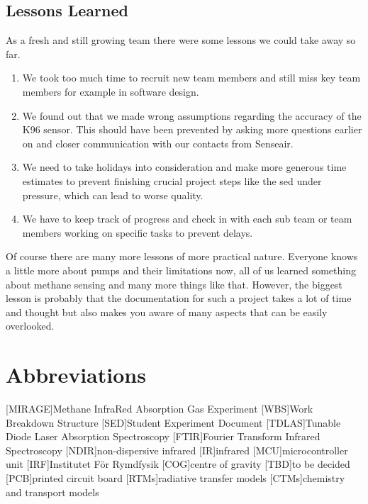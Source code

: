 \documentclass[12pt,a4paper]{report}
\begin{document}
\section{Lessons Learned}
As a fresh and still growing team there were some lessons we could take away so far. 
\begin{enumerate}
  \item We took too much time to recruit new team members and still miss key team members for example in software design.
  \item We found out that we made wrong assumptions regarding the accuracy of the K96 sensor. This should have been prevented by asking more questions earlier on and closer communication with our contacts from Senseair.
  \item We need to take holidays into consideration and make more generous time estimates to prevent finishing crucial project steps like the \ac{sed} under pressure, which can lead to worse quality.
  \item We have to keep track of progress and check in with each sub team or team members working on specific tasks to prevent delays.
\end{enumerate}
Of course there are many more lessons of more practical nature. Everyone knows a little more about pumps and their limitations now, all of us learned something about methane sensing and many more things like that. However, the biggest lesson is probably that the documentation for such a project takes a lot of time and thought but also makes you aware of many aspects that can be easily overlooked.

\chapter{Abbreviations}

\begin{acronym}[LONGESTACRONYM]
[MIRAGE]{Methane InfraRed Absorption Gas Experiment}
[WBS]{Work Breakdown Structure}
[SED]{Student Experiment Document}
[TDLAS]{Tunable Diode Laser Absorption Spectroscopy}
[FTIR]{Fourier Transform Infrared Spectroscopy}
[NDIR]{non-dispersive infrared}
[IR]{infrared}
[MCU]{microcontroller unit}
[IRF]{Institutet För Rymdfysik}
[COG]{centre of gravity}
[TBD]{to be decided}
[PCB]{printed circuit board}
[RTMs]{radiative transfer models}
[CTMs]{chemistry and transport models}
\end{acronym}
\end{document}
